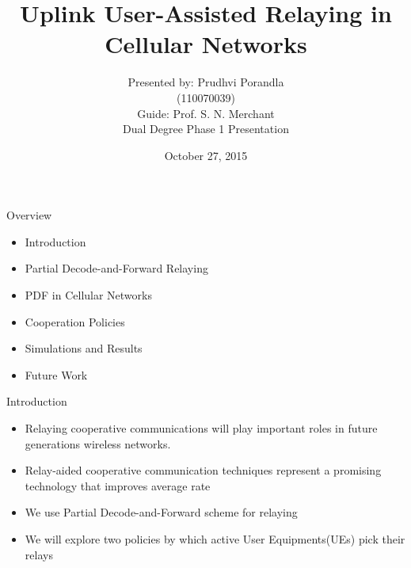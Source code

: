 \documentclass{beamer}
\title{Uplink User-Assisted Relaying in Cellular Networks}
\author{Presented by: Prudhvi Porandla \\ \quad (110070039)\\
\vspace{2mm}
Guide: Prof. S. N. Merchant \\
\vspace{2mm}
Dual Degree Phase 1 Presentation}
\date{October 27, 2015}
\begin{document}
\begin{frame}
  \titlepage
\end{frame}

\begin{frame}{Overview}
  \begin{itemize}
  \item Introduction
  \vspace{3mm}
  \item  Partial Decode-and-Forward Relaying
  \vspace{3mm}
  \item PDF in Cellular Networks
  \vspace{3mm}
  \item Cooperation Policies 
  \vspace{3mm}
  \item Simulations and Results
  \vspace{3mm}
  \item Future Work
  \end{itemize}
\end{frame}




\begin{frame}{Introduction}
  \begin{itemize}
  \item Relaying cooperative communications will play important roles in future generations wireless networks.
  \vspace{0.5cm}
  \item Relay-aided cooperative communication techniques represent a promising technology that improves average rate
  \vspace{0.5cm}
  \item We use Partial Decode-and-Forward scheme for relaying
  \vspace{0.5cm}
  \item We will explore two policies by which active User Equipments(UEs) pick their relays
  \end{itemize}
\end{frame}
\end{document}

